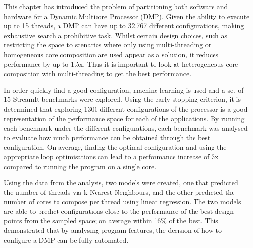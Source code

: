 This chapter has introduced the problem of partitioning both software and hardware for a Dynamic Multicore Processor (DMP).
Given the ability to execute up to 15 threads, a DMP can have up to 32,767 different configurations, making exhaustive search a prohibitive task.
Whilst certain design choices, such as restricting the space to scenarios where only using multi-threading or homogeneous core composition are used appear as a solution, it reduces performance by up to 1.5x.
Thus it is important to look at heterogeneous core-composition with multi-threading to get the best performance.

In order quickly find a good configuration, machine learning is used and a set of 15 StreamIt benchmarks were explored.
Using the early-stopping criterion, it is determined that exploring 1300 different configurations of the processor is a good representation of the performance space for each of the applications.
By running each benchmark under the different configurations, each benchmark was analysed to evaluate how much performance can be obtained through the best configuration.
On average, finding the optimal configuration and using the appropriate loop optimisations can lead to a performance increase of 3x compared to running the program on a single core.

Using the data from the analysis, two models were created, one that predicted the number of threads via k Nearest Neighbours, and the other predicted the number of cores to compose per thread using linear regression.
The two models are able to predict configurations close to the performance of the best design points from the sampled space; on average within 16\% of the best.
This demonstrated that by analysing program features, the decision of how to configure a DMP can be fully automated.

